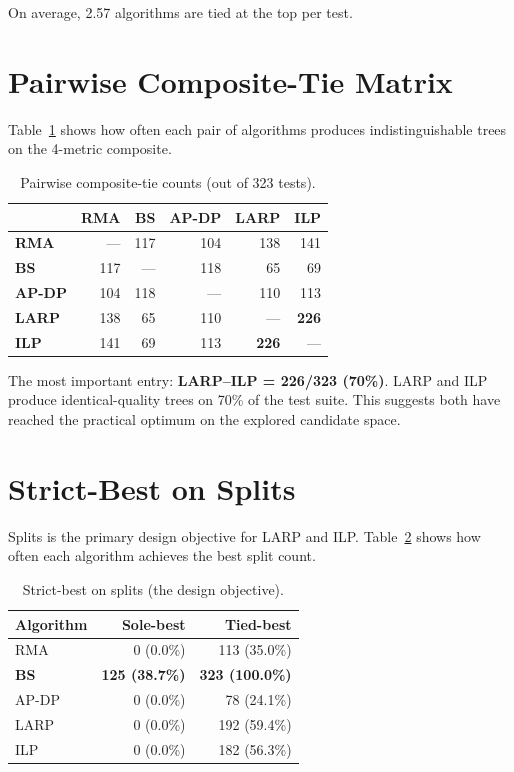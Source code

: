 On average, 2.57 algorithms are tied at the top per test.

\section{Pairwise Composite-Tie Matrix}

Table~\ref{tab:pairwise} shows how often each pair of algorithms produces indistinguishable trees on the 4-metric composite.

\begin{table}[H]
\centering
\caption{Pairwise composite-tie counts (out of 323 tests).}
\label{tab:pairwise}
\begin{tabular}{|l|r|r|r|r|r|}
\hline
 & \textbf{RMA} & \textbf{BS} & \textbf{AP-DP} & \textbf{LARP} & \textbf{ILP} \\
\hline
\textbf{RMA} & --- & 117 & 104 & 138 & 141 \\
\hline
\textbf{BS} & 117 & --- & 118 & 65 & 69 \\
\hline
\textbf{AP-DP} & 104 & 118 & --- & 110 & 113 \\
\hline
\textbf{LARP} & 138 & 65 & 110 & --- & \textbf{226} \\
\hline
\textbf{ILP} & 141 & 69 & 113 & \textbf{226} & --- \\
\hline
\end{tabular}
\end{table}

The most important entry: \textbf{LARP--ILP = 226/323 (70\%)}. LARP and ILP produce identical-quality trees on 70\% of the test suite. This suggests both have reached the practical optimum on the explored candidate space.

\section{Strict-Best on Splits}

Splits is the primary design objective for LARP and ILP. Table~\ref{tab:splits_best} shows how often each algorithm achieves the best split count.

\begin{table}[H]
\centering
\caption{Strict-best on splits (the design objective).}
\label{tab:splits_best}
\begin{tabular}{|l|r|r|}
\hline
\textbf{Algorithm} & \textbf{Sole-best} & \textbf{Tied-best} \\
\hline
RMA & 0 (0.0\%) & 113 (35.0\%) \\
\hline
\textbf{BS} & \textbf{125 (38.7\%)} & \textbf{323 (100.0\%)} \\
\hline
AP-DP & 0 (0.0\%) & 78 (24.1\%) \\
\hline
LARP & 0 (0.0\%) & 192 (59.4\%) \\
\hline
ILP & 0 (0.0\%) & 182 (56.3\%) \\
\hline
\end{tabular}
\end{table}

